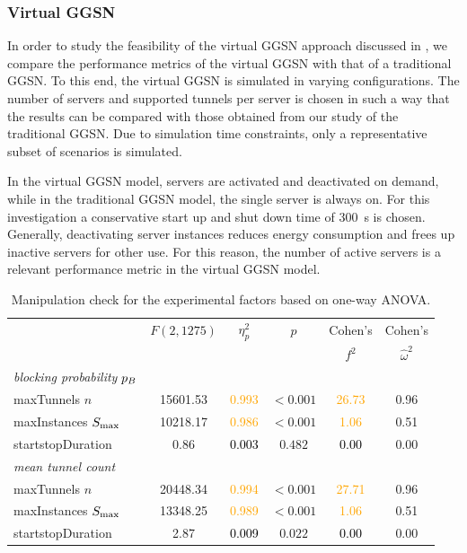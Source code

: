 \subsubsection*{Virtual GGSN}\label{sec:cloud:virtualized_network_functions:performance_evaluation:virtual_ggsn}

In order to study the feasibility of the virtual \gls{GGSN} approach discussed in , we compare the performance metrics of the virtual \gls{GGSN} with that of a traditional \gls{GGSN}.
To this end, the virtual \gls{GGSN} is simulated in varying configurations.
The number of servers and supported tunnels per server is chosen in such a way that the results can be compared with those obtained from our study of the traditional \gls{GGSN}.
Due to simulation time constraints, only a representative subset of scenarios is simulated.

In the virtual \gls{GGSN} model, servers are activated and deactivated on demand, while in the traditional \gls{GGSN} model, the single server is always on.
For this investigation a conservative start up and shut down time of \SI{300}{\second} is chosen.
Generally, deactivating server instances reduces energy consumption and frees up inactive servers for other use.
For this reason, the number of active servers is a relevant performance metric in the virtual \gls{GGSN} model.

\begin{table}\caption{Manipulation check for the experimental factors based on one-way ANOVA.}
\centering
\label{tab:cloud:virtualized_network_functions:performance_evaluation:virtual_ggsn:manipulation}
\tabcolsep=0.11cm
\begin{tabular}{lccccc}
\toprule
& \(F(2,1275)\) & \(\eta^2_p\) & \(p\) & Cohen's & Cohen's\\ 
&  & & & \(f^2\) & \(\hat{\omega}^2\) \\ 
\midrule
\emph{blocking probability} \(p_B\)  & & & & &\\ 
maxTunnels \(n\)&  15601.53 & \textcolor{orange}{0.993} & $<0.001$ & \textcolor{orange}{26.73} & 0.96\\ 
maxInstances \(S_{\max}\)&  10218.17 & \textcolor{orange}{0.986} & $<0.001$ & \textcolor{orange}{1.06} & 0.51\\ 
startstopDuration &  0.86 & \textcolor{black}{0.003} & $0.482$ & \textcolor{black}{0.00} & 0.00\\ 
\midrule
\emph{mean tunnel count}  & & & & &\\ 
maxTunnels \(n\)&  20448.34 & \textcolor{orange}{0.994} & $<0.001$ & \textcolor{orange}{27.71} & 0.96\\ 
maxInstances \(S_{\max}\)&  13348.25 & \textcolor{orange}{0.989} & $<0.001$ & \textcolor{orange}{1.06} & 0.51\\ 
startstopDuration &  2.87 & \textcolor{black}{0.009} & $0.022$ & \textcolor{black}{0.00} & 0.00\\ 
\bottomrule
\end{tabular}
\end{table}

